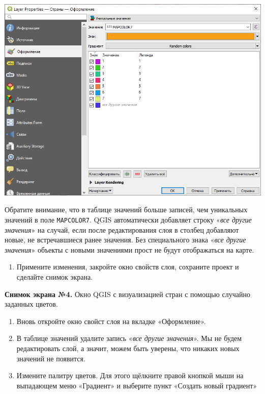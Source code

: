 \documentclass[
  12pt,
]{book}
\providecommand{\tightlist}{%
  \setlength{\itemsep}{0pt}\setlength{\parskip}{0pt}}
\begin{document}
\includegraphics{images/Ex01_WorldMap/Map_classes.png}

Обратите внимание, что в таблице значений больше записей, чем уникальных значений в поле \texttt{MAPCOLOR7}. QGIS автоматически добавляет строку «\emph{все другие значения}» на случай, если после редактирования слоя в столбец добавляют новые, не встречавшиеся ранее значения. Без специального знака «\emph{все другие значения}» объекты с новыми значениями прост не будут отображаться на карте.

\begin{enumerate}
\def\labelenumi{\arabic{enumi}.}
\setcounter{enumi}{9}
\tightlist
\item
  Примените изменения, закройте окно свойств слоя, сохраните проект и сделайте снимок экрана.
\end{enumerate}

\textbf{Снимок экрана №4.} Окно QGIS с визуализацией стран с помощью случайно заданных цветов.

\begin{enumerate}
\def\labelenumi{\arabic{enumi}.}
\setcounter{enumi}{10}
\item
  Вновь откройте окно свойст слоя на вкладке «Оформление».
\item
  В таблице значений удалите запись «\emph{все другие значения}». Мы не будем редактировать слой, а значит, можем быть уверены, что никаких новых значений не появится.
\item
  Измените палитру цветов. Для этого щёлкните правой кнопкой мыши на выпадающем меню «Градиент» и выберите пункт «Создать новый градиент»
\end{enumerate}
\end{document}

